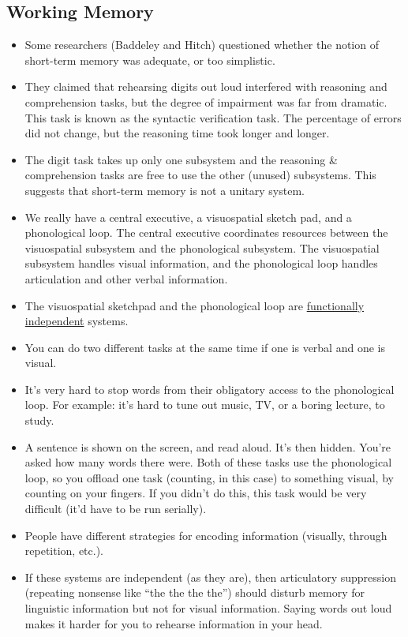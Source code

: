 \documentclass[]{article}
\begin{document}
		\subsection{Working Memory}
			\begin{itemize}
				\item Some researchers (Baddeley and Hitch) questioned whether the notion of short-term memory was adequate, or too simplistic.
				\item They claimed that rehearsing digits out loud interfered with reasoning and comprehension tasks, but the degree of impairment was far from dramatic. This task is known as the syntactic verification task. The percentage of errors did not change, but the reasoning time took longer and longer.
				\item The digit task takes up only one subsystem and the reasoning \& comprehension tasks are free to use the other (unused) subsystems. This suggests that short-term memory is not a unitary system.
				\item We really have a central executive, a visuospatial sketch pad, and a phonological loop. The central executive coordinates resources between the visuospatial subsystem and the phonological subsystem. The visuospatial subsystem handles visual information, and the phonological loop handles articulation and other verbal information.
				\item The visuospatial sketchpad and the phonological loop are \underline{functionally independent} systems.
				\item You can do two different tasks at the same time if one is verbal and one is visual.
				\item It's very hard to stop words from their obligatory access to the phonological loop. For example: it's hard to tune out music, TV, or a boring lecture, to study.
				\item A sentence is shown on the screen, and read aloud. It's then hidden. You're asked how many words there were. Both of these tasks use the phonological loop, so you offload one task (counting, in this case) to something visual, by counting on your fingers. If you didn't do this, this task would be very difficult (it'd have to be run serially).
				\item People have different strategies for encoding information (visually, through repetition, etc.).
				\item If these systems are independent (as they are), then articulatory suppression (repeating nonsense like ``the the the the'') should disturb memory for linguistic information but not for visual information. Saying words out loud makes it harder for you to rehearse information in your head.

\end{itemize}
\end{document}
